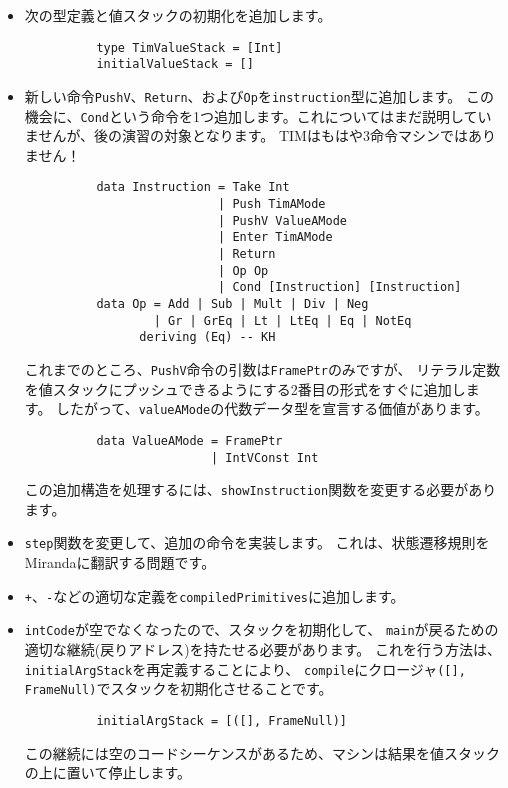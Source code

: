 \documentclass{jarticle}
\begin{document}
\begin{itemize}
	\item 次の型定義と値スタックの初期化を追加します。
	      \begin{verbatim}
          type TimValueStack = [Int]
          initialValueStack = []
        \end{verbatim}
	\item 新しい命令\texttt{PushV}、\texttt{Return}、および\texttt{Op}を\texttt{instruction}型に追加します。
	      この機会に、\texttt{Cond}という命令を1つ追加します。これについてはまだ説明していませんが、後の演習の対象となります。
	      TIMはもはや3命令マシンではありません！
	      \begin{verbatim}
          data Instruction = Take Int
                           | Push TimAMode
                           | PushV ValueAMode
                           | Enter TimAMode
                           | Return
                           | Op Op
                           | Cond [Instruction] [Instruction]
          data Op = Add | Sub | Mult | Div | Neg
                  | Gr | GrEq | Lt | LtEq | Eq | NotEq
                deriving (Eq) -- KH
        \end{verbatim}
	      これまでのところ、\texttt{PushV}命令の引数は\texttt{FramePtr}のみですが、
	      リテラル定数を値スタックにプッシュできるようにする2番目の形式をすぐに追加します。
	      したがって、\texttt{valueAMode}の代数データ型を宣言する価値があります。
	      \begin{verbatim}
          data ValueAMode = FramePtr
                          | IntVConst Int
        \end{verbatim}
	      この追加構造を処理するには、\texttt{showInstruction}関数を変更する必要があります。
	\item \texttt{step}関数を変更して、追加の命令を実装します。
	      これは、状態遷移規則をMirandaに翻訳する問題です。
	\item \texttt{+}、\texttt{-}などの適切な定義を\texttt{compiledPrimitives}に追加します。
	\item \texttt{intCode}が空でなくなったので、スタックを初期化して、
	      \texttt{main}が戻るための適切な継続(戻りアドレス)を持たせる必要があります。
	      これを行う方法は、\texttt{initialArgStack}を再定義することにより、
	      \texttt{compile}にクロージャ\texttt{([], FrameNull)}でスタックを初期化させることです。
	      \begin{verbatim}
          initialArgStack = [([], FrameNull)]
        \end{verbatim}
	      この継続には空のコードシーケンスがあるため、マシンは結果を値スタックの上に置いて停止します。
\end{itemize}
\end{document}
